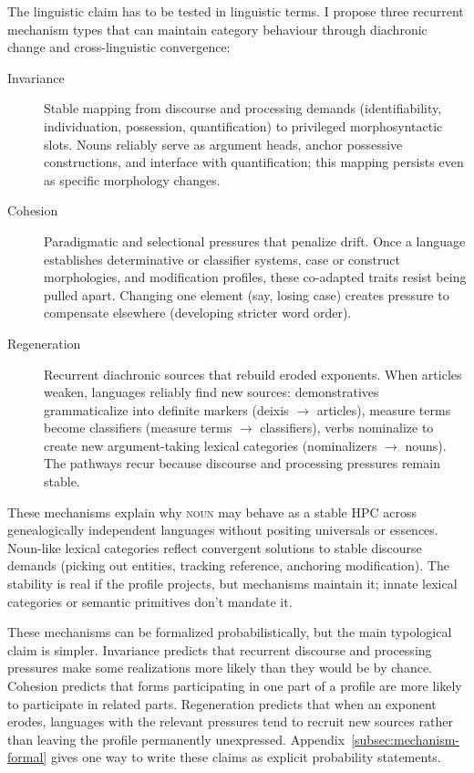 \documentclass[12pt]{article}
\begin{document}
The linguistic claim has to be tested in linguistic terms. I propose three recurrent mechanism types that can maintain category behaviour through diachronic change and cross-linguistic convergence:


\begin{description}
    \item[Invariance] Stable mapping from discourse and processing demands (identifiability, individuation, possession, quantification) to privileged morphosyntactic slots. Nouns reliably serve as argument heads, anchor possessive constructions, and interface with quantification; this mapping persists even as specific morphology changes.

    \item[Cohesion] Paradigmatic and selectional pressures that penalize drift. Once a language establishes determinative or classifier systems, case or construct morphologies, and modification profiles, these co-adapted traits resist being pulled apart. Changing one element (say, losing case) creates pressure to compensate elsewhere (developing stricter word order).

    \item[Regeneration] Recurrent diachronic sources that rebuild eroded exponents. When articles weaken, languages reliably find new sources: demonstratives grammaticalize into definite markers (deixis $\to$ articles), measure terms become classifiers (measure terms $\to$ classifiers), verbs nominalize to create new argument-taking lexical categories (nominalizers $\to$ nouns). The pathways recur because discourse and processing pressures remain stable.
\end{description}

These mechanisms explain why \textsc{noun} may behave as a stable HPC across genealogically independent languages without positing universals or essences. Noun-like lexical categories reflect convergent solutions to stable discourse demands (picking out entities, tracking reference, anchoring modification). The stability is real if the profile projects, but mechanisms maintain it; innate lexical categories or semantic primitives don't mandate it.

These mechanisms can be formalized probabilistically, but the main typological claim is simpler. Invariance predicts that recurrent discourse and processing pressures make some realizations more likely than they would be by chance. Cohesion predicts that forms participating in one part of a profile are more likely to participate in related parts. Regeneration predicts that when an exponent erodes, languages with the relevant pressures tend to recruit new sources rather than leaving the profile permanently unexpressed. Appendix~\ref{subsec:mechanism-formal} gives one way to write these claims as explicit probability statements.
\end{document}
